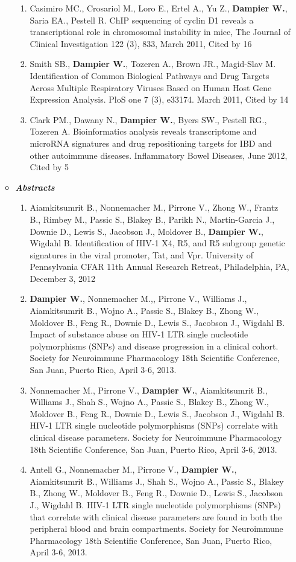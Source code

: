 \documentclass[a4paper,11pt]{article}
\begin{document}
\begin{enumerate}
\begin{itemize}
\begin{enumerate}[label=\arabic{enumii}.]
   \item Casimiro MC., Crosariol M., Loro E., Ertel A., Yu Z., \textbf{Dampier W.}, Saria EA., Pestell R. ChIP sequencing of cyclin D1 reveals a transcriptional role in chromosomal instability in mice, The Journal of Clinical Investigation 122 (3), 833, March 2011, Cited by 16
   \item Smith SB., \textbf{Dampier W.}, Tozeren A., Brown JR., Magid-Slav M. Identification of Common Biological Pathways and Drug Targets Across Multiple Respiratory Viruses Based on Human Host Gene Expression Analysis. PloS one 7 (3), e33174. March 2011, Cited by 14
   \item Clark PM., Dawany N., \textbf{Dampier W.}, Byers SW., Pestell RG., Tozeren A. Bioinformatics analysis reveals transcriptome and microRNA signatures and drug repositioning targets for IBD and other autoimmune diseases. Inflammatory Bowel Diseases, June 2012, Cited by 5
  \end{enumerate}
  \item[] {\Large \bfseries \itshape Abstracts}
  \begin{enumerate}[label=\arabic{enumii}.]
   \item Aiamkitsumrit B., Nonnemacher M., Pirrone V., Zhong W., Frantz B., Rimbey M., Passic S., Blakey B., Parikh N., Martin-Garcia J., Downie D., Lewis S., Jacobson J., Moldover B., \textbf{Dampier W.}, Wigdahl B. Identification of HIV-1 X4, R5, and R5 subgroup genetic signatures in the viral promoter, Tat, and Vpr. University of Pennsylvania CFAR 11th Annual Research Retreat, Philadelphia, PA, December 3, 2012
   \item \textbf{Dampier W.}, Nonnemacher M.,, Pirrone V., Williams J., Aiamkitsumrit B., Wojno A., Passic S., Blakey B., Zhong W., Moldover B., Feng R., Downie D., Lewis S., Jacobson J., Wigdahl B. Impact of substance abuse on HIV-1 LTR single nucleotide polymorphisms (SNPs) and disease progression in a clinical cohort. Society for Neuroimmune Pharmacology 18th Scientific Conference, San Juan, Puerto Rico, April 3-6, 2013.
   \item Nonnemacher M., Pirrone V., \textbf{Dampier W.}, Aiamkitsumrit B., Williams J., Shah S., Wojno A., Passic S., Blakey B., Zhong W., Moldover B., Feng R., Downie D., Lewis S., Jacobson J., Wigdahl B. HIV-1 LTR single nucleotide polymorphisms (SNPs) correlate with clinical disease parameters. Society for Neuroimmune Pharmacology 18th Scientific Conference, San Juan, Puerto Rico, April 3-6, 2013.
   \item Antell G., Nonnemacher M., Pirrone V., \textbf{Dampier W.}, Aiamkitsumrit B., Williams J., Shah S., Wojno A., Passic S., Blakey B., Zhong W., Moldover B., Feng R., Downie D., Lewis S., Jacobson J., Wigdahl B. HIV-1 LTR single nucleotide polymorphisms (SNPs) that correlate with clinical disease parameters are found in both the peripheral blood and brain compartments. Society for Neuroimmune Pharmacology 18th Scientific Conference, San Juan, Puerto Rico, April 3-6, 2013.

\end{enumerate}
\end{itemize}
\end{enumerate}
\end{document}
